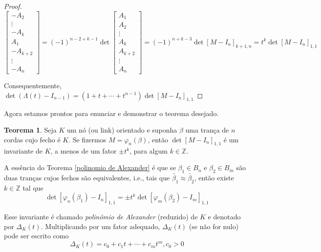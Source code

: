 \documentclass[a4paper,portuguese,11pt,twoside, leqno]{book}
\theoremstyle{definition}
\newtheorem{theorem}{Teorema}[section]
\begin{document}
\begin{proof}
\begin{equation*}
\begin{bmatrix}
		-A_2 \\
		\vdots\\
		-A_k\\
		A_1\\
		-A_{k+2}\\
		\vdots\\
		-A_n
		\end{bmatrix} = (-1)^{n-2+k-1}\det\begin{bmatrix}
		A_1\\
		A_2\\
		\vdots\\
		A_k\\
		A_{k+2}\\
		\vdots\\
		A_n
		\end{bmatrix} = (-1)^{n+k-3}\det[M - I_n]_{k+1, n} = t^k\det[M - I_n]_{1,1}
		\end{equation*}
		\par\vspace{0.3cm} Consequentemente, $\det(\Lambda(t) - I_{n-1}) = (1+t+\cdots+t^{n-1})\det[M - I_n]_{1,1}$	
	\end{proof}
	\par\vspace{0.3cm} Agora estamos prontos para enunciar e demonstrar o teorema desejado.
	\begin{theorem}
		\label{polinomio de Alexander}
		Seja $K$ um nó (ou link) orientado e suponha $\beta$ uma trança de $n$ cordas cujo fecho é $K$. Se fizermos $M = \varphi_n(\beta)$, então $\det[M - I_n]_{1,1}$ é um invariante de $K$, a menos de um fator $\pm t^k$, para algum $k\in\mathbb{Z}$.
	\end{theorem} 
	\par\vspace{0.3cm} A essência do Teorema \eqref{polinomio de Alexander} é que se $\beta_1\in B_n$ e $\beta_2\in B_m$ são duas tranças cujos fechos são equivalentes, i.e., tais que $\widetilde{\beta_1}\approx\widetilde{\beta_2}$, então existe $k\in\mathbb{Z}$ tal que
	\begin{equation*}
	\det[\varphi_n(\beta_1) - I_n]_{1,1}=\pm t^k\det[\varphi_m(\beta_2) - I_m]_{1,1}
	\end{equation*}
	\par\vspace{0.3cm} Esse invariante é chamado \textit{polinômio de Alexander} (reduzido) de $K$ e denotado por $\Delta_K(t)$. Multiplicando por um fator adequado, $\Delta_K(t)$ (se não for nulo) pode ser escrito como
	\begin{equation*}
	\Delta_K(t) = c_0 + c_1t + \cdots + c_mt^m, c_0>0
	\end{equation*}
\end{document}
